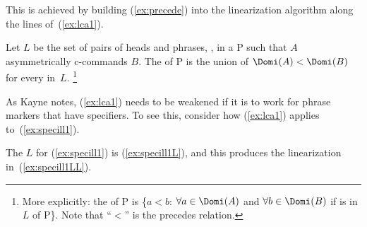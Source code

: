 \documentclass[output=paper]{langsci/langscibook}
\begin{document}
This is achieved by building (\ref{ex:precede}) into the linearization
algorithm along the lines of~(\ref{ex:lca1}).
\begin{exe}
	\ex \label{ex:lca1}
	\begin{xlist}
		\ex Let $L$ be the set of pairs of heads and phrases, , in a  P such that $A$ asymmetrically c-commands $B$.
		\ex The  of P is the union of $\Domi(A) < \Domi(B)$ for every  in~$L$.%
		\footnote{More explicitly: the  of P is \{$a<b$: $\forall a \in \Domi(A)$ and $\forall b \in \Domi(B)$ if  is in $L$ of P\}. Note that ``$<$'' is the precedes relation.} %
	\end{xlist}
\end{exe}

As Kayne notes, (\ref{ex:lca1}) needs to be weakened if it is to work for
phrase markers that have specifiers. To see this, consider how (\ref{ex:lca1})
applies to~(\ref{ex:specill1}).\largerpage[-2]

\ea\label{ex:specill1}
\z

\noindent The $L$ for (\ref{ex:specill1}) is (\ref{ex:specill1L}), and this produces the
linearization in~(\ref{ex:specill1LL}).
\end{document}

